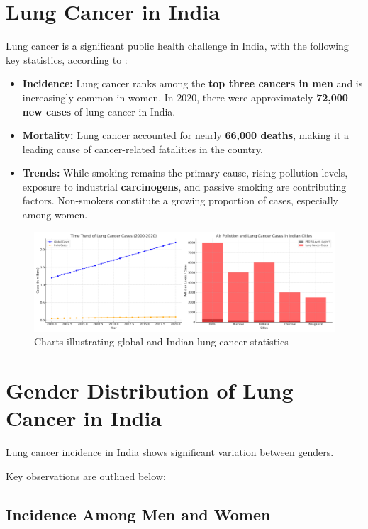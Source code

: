 \section{Lung Cancer in India}
Lung cancer is a significant public health challenge in India, with the following key statistics, according to \cite{singh2021lung}:
\begin{highlight}
\begin{itemize}
    \item \textbf{Incidence:} Lung cancer ranks among the \textbf{top three cancers in men} and is increasingly common in women. In 2020, there were approximately \textbf{72,000 new cases} of lung cancer in India.
    \item \textbf{Mortality:} Lung cancer accounted for nearly \textbf{66,000 deaths}, making it a leading cause of cancer-related fatalities in the country.
    \item \textbf{Trends:} While smoking remains the primary cause, rising pollution levels, exposure to industrial \textbf{carcinogens}, and passive smoking are contributing factors. Non-smokers constitute a growing proportion of cases, especially among women.
\end{itemize}
\end{highlight}
\begin{figure}[h!]
    \centering
    \includegraphics[width=\textwidth]{images/lung_cancer_additional_charts.png}
    \caption{Charts illustrating global and Indian lung cancer statistics}
    \label{fig:lung_stats_2}
\end{figure}
\section{Gender Distribution of Lung Cancer in India}
\begin{remark}
Lung cancer incidence in India shows significant variation between genders. 
\end{remark} 
Key observations are outlined below:

\subsection{Incidence Among Men and Women}

